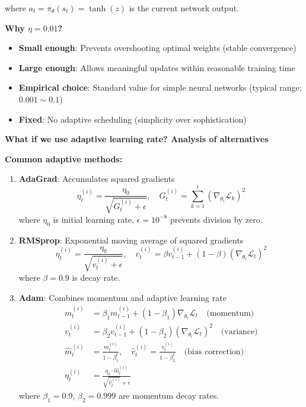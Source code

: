\documentclass[11pt,a4paper]{article}
\begin{document}
\begin{itemize}
where $a_t = \pi_\theta(s_t) = \tanh(z)$ is the current network output.

\textbf{Why $\eta = 0.01$?}
\begin{itemize}
    \item \textbf{Small enough}: Prevents overshooting optimal weights (stable convergence)
    \item \textbf{Large enough}: Allows meaningful updates within reasonable training time
    \item \textbf{Empirical choice}: Standard value for simple neural networks (typical range: $0.001 \sim 0.1$)
    \item \textbf{Fixed}: No adaptive scheduling (simplicity over sophistication)
\end{itemize}

\textbf{What if we use adaptive learning rate? Analysis of alternatives}

\textbf{Common adaptive methods:}

\begin{enumerate}
    \item \textbf{AdaGrad}: Accumulates squared gradients
    \begin{equation}
    \eta_t^{(i)} = \frac{\eta_0}{\sqrt{G_t^{(i)} + \epsilon}}, \quad G_t^{(i)} = \sum_{k=1}^{t} (\nabla_{\theta_i} \mathcal{L}_k)^2
    \end{equation}
    where $\eta_0$ is initial learning rate, $\epsilon = 10^{-8}$ prevents division by zero.
    
    \item \textbf{RMSprop}: Exponential moving average of squared gradients
    \begin{equation}
    \eta_t^{(i)} = \frac{\eta_0}{\sqrt{v_t^{(i)} + \epsilon}}, \quad v_t^{(i)} = \beta v_{t-1}^{(i)} + (1-\beta)(\nabla_{\theta_i} \mathcal{L}_t)^2
    \end{equation}
    where $\beta = 0.9$ is decay rate.
    
    \item \textbf{Adam}: Combines momentum and adaptive learning rate
    \begin{align}
    m_t^{(i)} &= \beta_1 m_{t-1}^{(i)} + (1-\beta_1)\nabla_{\theta_i} \mathcal{L}_t \quad \text{(momentum)} \\
    v_t^{(i)} &= \beta_2 v_{t-1}^{(i)} + (1-\beta_2)(\nabla_{\theta_i} \mathcal{L}_t)^2 \quad \text{(variance)} \\
    \hat{m}_t^{(i)} &= \frac{m_t^{(i)}}{1-\beta_1^t}, \quad \hat{v}_t^{(i)} = \frac{v_t^{(i)}}{1-\beta_2^t} \quad \text{(bias correction)} \\
    \eta_t^{(i)} &= \frac{\eta_0 \cdot \hat{m}_t^{(i)}}{\sqrt{\hat{v}_t^{(i)}} + \epsilon}
    \end{align}
    where $\beta_1 = 0.9$, $\beta_2 = 0.999$ are momentum decay rates.
\end{enumerate}


\end{itemize}
\end{document}
